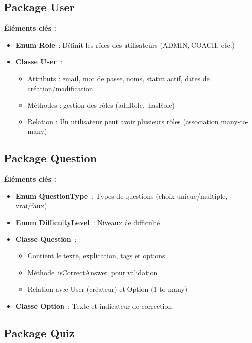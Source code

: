 \documentclass[12pt,a4paper,twoside,openright]{report}
\begin{document}
\hypertarget{package-user}{%
\subsection{Package User}\label{package-user}}

\textbf{Éléments clés :}

\begin{itemize}
\item
  \textbf{Enum Role}~: Définit les rôles des utilisateurs (ADMIN, COACH,
  etc.)
\item
  \textbf{Classe User}~:

  \begin{itemize}
  \item
    Attributs : email, mot de passe, noms, statut actif, dates de
    création/modification
  \item
    Méthodes : gestion des rôles (addRole,~hasRole)
  \item
    Relation : Un utilisateur peut avoir plusieurs rôles (association
    many-to-many)
  \end{itemize}
\end{itemize}

\hypertarget{package-question}{%
\subsection{Package Question}\label{package-question}}

\textbf{Éléments clés :}

\begin{itemize}
\item
  \textbf{Enum QuestionType}~: Types de questions (choix
  unique/multiple, vrai/faux)
\item
  \textbf{Enum DifficultyLevel}~: Niveaux de difficulté
\item
  \textbf{Classe Question}~:

  \begin{itemize}
  \item
    Contient le texte, explication, tags et options
  \item
    Méthode~isCorrectAnswer~pour validation
  \item
    Relation avec User (créateur) et Option (1-to-many)
  \end{itemize}
\item
  \textbf{Classe Option}~: Texte et indicateur de correction
\end{itemize}

\hypertarget{package-quiz}{%
\subsection{Package Quiz}\label{package-quiz}}
\end{document}
